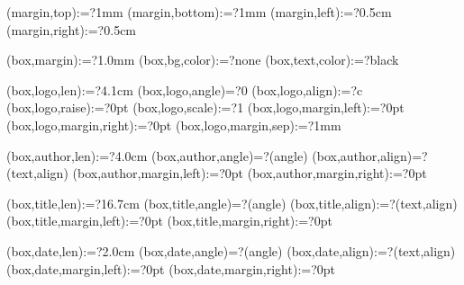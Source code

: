 \spine(margin,top):=?{1mm}
\spine(margin,bottom):=?{1mm}
\spine(margin,left):=?{0.5cm}
\spine(margin,right):=?{0.5cm}

\spine(box,margin):=?{1.0mm}
\spine(box,bg,color):=?{none}
\spine(box,text,color):=?{black}

\spine(box,logo,len):=?{4.1cm}
\spine(box,logo,angle)=?{0}
\spine(box,logo,align):=?{c}
\spine(box,logo,raise):=?{0pt}
\spine(box,logo,scale):=?{1}
\spine(box,logo,margin,left):=?{0pt}
\spine(box,logo,margin,right):=?{0pt}
\spine(box,logo,margin,sep):=?{1mm}

\spine(box,author,len):=?{4.0cm}
\spine(box,author,angle)=?{\thespine(angle)}
\spine(box,author,align)=?{\thespine(text,align)}
\spine(box,author,margin,left):=?{0pt}
\spine(box,author,margin,right):=?{0pt}

\spine(box,title,len):=?{16.7cm}
\spine(box,title,angle)=?{\thespine(angle)}
\spine(box,title,align):=?{\thespine(text,align)}
\spine(box,title,margin,left):=?{0pt}
\spine(box,title,margin,right):=?{0pt}

\spine(box,date,len):=?{2.0cm}
\spine(box,date,angle)=?{\thespine(angle)}
\spine(box,date,align):=?{\thespine(text,align)}
\spine(box,date,margin,left):=?{0pt}
\spine(box,date,margin,right):=?{0pt}



\newif\ifisdim
\newcommand{\@setifisdim}[1]{%
  \StrLeft{#1}{1}[\@dimleft]%
  \StrRight{#1}{1}[\@dimright]%
  \IfInteger{\@dimleft}{%
    \IfInteger{\@dimright}{%
      \isdimfalse%
    }{%
      \isdimtrue%
    }%
  }{%
    \isdimfalse%
  }%
}
\newcommand{\IfIsDim}[3]{%
  \@setifisdim{#1}%
  \ifisdim#2\else#3\fi%
}

%

\newdimen\@spinelen  %
\newcommand{\@checkspinelen}[1][\paperheight]{%
  \@tempdima=\thespine(margin,left)\relax%
  \@tempdimb=\thespine(margin,right)\relax%
  \DEBUG{SPINELEN MARGIN [left] = \the\@tempdima}%
  \DEBUG{SPINELEN MARGIN [right] = \the\@tempdimb}%
  \@tempdima=\dimexpr\@tempdima+\@tempdimb\relax%
  \DEBUG{SPINELEN ACCUMULATED = \the\@tempdima}%
  \StrCount{\thespine(order)}{,}[\@nBoxSep]%
  \@for\myi:=\expanded{\thespine(order)}\do{%
    \DEBUG{SPINELEN BOXLEN [\myi]}%
    \@tempdimb=\thespine(box,\myi,len)\relax%
    \DEBUG{SPINELEN BOXLEN [\myi] = \the\@tempdimb}%
    \@tempdima=\dimexpr\@tempdima+\@tempdimb\relax%
    \DEBUG{SPINELEN ACCUMULATED = \the\@tempdima}%
  }
  \DEBUG{SPINELEN MAX = \the#1}%
  \@spinelen=\@tempdima%
}


